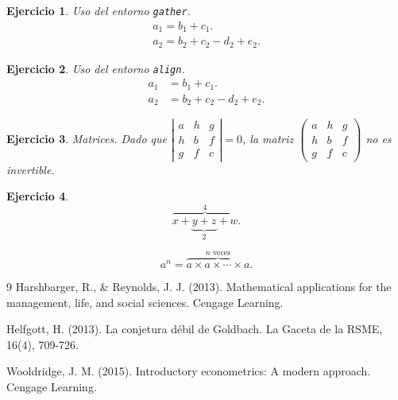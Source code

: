 \documentclass[12pt,a4paper]{article}
\newtheorem{ejer}{Ejercicio}
\begin{document}
\begin{ejer}
	Uso del entorno \verb|gather|.
	\begin{gather}
		a_{1}=b_{1}+c_{1}.\\
		a_{2}=b_{2}+c_{2}-d_{2}+e_{2}.
	\end{gather}
\end{ejer}

\begin{ejer}
	Uso del entorno \verb|align|.
	\begin{align}
		a_{1} & =b_{1}+c_{1}.             \\
		a_{2} & =b_{2}+c_{2}-d_{2}+e_{2}.
	\end{align}
\end{ejer}

\begin{ejer}
	Matrices.
	Dado que
	$
		\left|
		\begin{smallmatrix}
			a & h & g\\
			h & b & f\\
			g & f & c
		\end{smallmatrix}
		\right|=0
	$,
	la matriz
	$
		\left(
		\begin{smallmatrix}
			a & h & g\\
			h & b & f\\
			g & f & c
		\end{smallmatrix}
		\right)
	$
	no es invertible.
\end{ejer}


\begin{ejer}
	\[
		\overbrace{x+\underbrace{y+z}_{2}+w}^{4}.
	\]

	\begin{displaymath}
		a^{n}=
		\overbrace{a\times a\times\cdots\times a}^{\mbox{$n$ veces}}.
	\end{displaymath}
\end{ejer}

\nocite{*}

\begin{thebibliography}{9}
	Harshbarger, R., \& Reynolds, J. J. (2013).
	Mathematical applications for the management, life, and social sciences.
	Cengage Learning.

	Helfgott, H. (2013).
	La conjetura débil de Goldbach.
	La Gaceta de la RSME, 16(4), 709-726.

	Wooldridge, J. M. (2015).
	Introductory econometrics: A modern approach.
	Cengage Learning.
\end{thebibliography}
\end{document}
